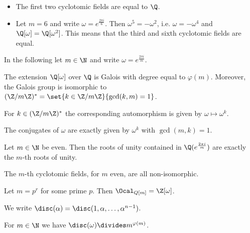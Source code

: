 	\begin{exmp*}
		\begin{itemize}
			\item The first two cyclotomic fields are equal to \( \Q \).
			\item Let \( m = 6 \) and write \( \omega = e^\frac{2\pi i}{6} \).
		Then \( \omega^5 = -\omega^2 \), i.e. \( \omega = -\omega^4 \) and \( \Q[\omega] = \Q[\omega^2] \).
		This means that the third and sixth cyclotomic fields are equal.
		
		\end{itemize}
	\end{exmp*}
			

In the following let \( m \in \N \) and write \( \omega = e^\frac{2\pi i}{m} \).

\begin{thmn}
	The extension \( \Q[\omega] \) over \( \Q \) is Galois with degree equal to \( \varphi(m) \).
	Moreover, the Galois group is isomorphic to \( (\Z/m\Z)^* = \set{k \in \Z/m\Z}{\gcd(k,m)=1} \).
\end{thmn}

For \( k \in (\Z/m\Z)^* \) the corresponding automorphism is given by \( \omega \mapsto \omega^k \).

\begin{prop}
	The conjugates of \( \omega \) are exactly given by \( \omega^k \) with \( \gcd(m,k)=1 \).
\end{prop}

\begin{cor}
	Let \( m \in \N \) be even.
	Then the roots of unity contained in \( \Q(e^\frac{2\pi i}{m}) \) are exactly the \( m \)-th roots of unity.
\end{cor}

\begin{cor}
	The \( m \)-th cyclotomic fields, for \( m \) even, are all non-isomorphic.
\end{cor}

\begin{thmn}
	Let \( m=p^r \) for some prime \( p \).
	Then \( \Ocal_{Q[m]} = \Z[\omega] \).
\end{thmn}

\begin{notat*}
	We write \( \disc(\alpha) = \disc(1, \alpha, \dotsc, \alpha^{n-1}) \).
\end{notat*}

\begin{lem}
	For \( m \in \N \) we have \( \disc(\omega) \divides m^{\varphi(m)} \).
\end{lem}